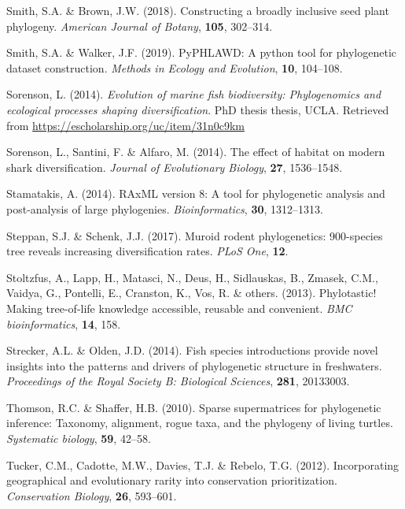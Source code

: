 \documentclass[]{article}
\begin{document}
\leavevmode\hypertarget{ref-smith2018constructing}{}%
Smith, S.A. \& Brown, J.W. (2018). Constructing a broadly inclusive seed plant phylogeny. \emph{American Journal of Botany}, \textbf{105}, 302--314.

\leavevmode\hypertarget{ref-smith2019pyphlawd}{}%
Smith, S.A. \& Walker, J.F. (2019). PyPHLAWD: A python tool for phylogenetic dataset construction. \emph{Methods in Ecology and Evolution}, \textbf{10}, 104--108.

\leavevmode\hypertarget{ref-sorenson2014evolution}{}%
Sorenson, L. (2014). \emph{Evolution of marine fish biodiversity: Phylogenomics and ecological processes shaping diversification}. PhD thesis thesis, UCLA. Retrieved from \url{https://escholarship.org/uc/item/31n0c9km}

\leavevmode\hypertarget{ref-sorenson2014effect}{}%
Sorenson, L., Santini, F. \& Alfaro, M. (2014). The effect of habitat on modern shark diversification. \emph{Journal of Evolutionary Biology}, \textbf{27}, 1536--1548.

\leavevmode\hypertarget{ref-stamatakis2014raxml}{}%
Stamatakis, A. (2014). RAxML version 8: A tool for phylogenetic analysis and post-analysis of large phylogenies. \emph{Bioinformatics}, \textbf{30}, 1312--1313.

\leavevmode\hypertarget{ref-steppan2017muroid}{}%
Steppan, S.J. \& Schenk, J.J. (2017). Muroid rodent phylogenetics: 900-species tree reveals increasing diversification rates. \emph{PLoS One}, \textbf{12}.

\leavevmode\hypertarget{ref-stoltzfus2013phylotastic}{}%
Stoltzfus, A., Lapp, H., Matasci, N., Deus, H., Sidlauskas, B., Zmasek, C.M., Vaidya, G., Pontelli, E., Cranston, K., Vos, R. \& others. (2013). Phylotastic! Making tree-of-life knowledge accessible, reusable and convenient. \emph{BMC bioinformatics}, \textbf{14}, 158.

\leavevmode\hypertarget{ref-strecker2014fish}{}%
Strecker, A.L. \& Olden, J.D. (2014). Fish species introductions provide novel insights into the patterns and drivers of phylogenetic structure in freshwaters. \emph{Proceedings of the Royal Society B: Biological Sciences}, \textbf{281}, 20133003.

\leavevmode\hypertarget{ref-thomson2010sparse}{}%
Thomson, R.C. \& Shaffer, H.B. (2010). Sparse supermatrices for phylogenetic inference: Taxonomy, alignment, rogue taxa, and the phylogeny of living turtles. \emph{Systematic biology}, \textbf{59}, 42--58.

\leavevmode\hypertarget{ref-tucker2012incorporating}{}%
Tucker, C.M., Cadotte, M.W., Davies, T.J. \& Rebelo, T.G. (2012). Incorporating geographical and evolutionary rarity into conservation prioritization. \emph{Conservation Biology}, \textbf{26}, 593--601.
\end{document}
